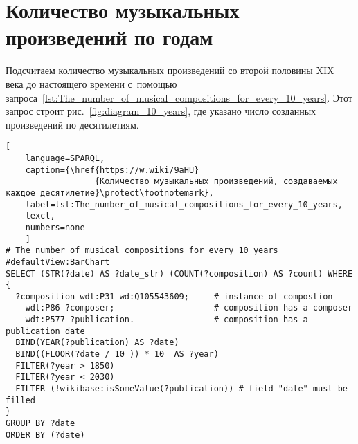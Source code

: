 





\section{Количество музыкальных произведений по годам}

Подсчитаем количество музыкальных произведений 
со второй половины XIX века до настоящего времени 
с~помощью запроса~\ref{lst:The_number_of_musical_compositions_for_every_10_years}. 
Этот запрос строит рис.~\ref{fig:diagram_10_years}, где 
указано число созданных произведений по десятилетиям. 


\begin{lstlisting}[ 
    language=SPARQL,
    caption={\href{https://w.wiki/9aHU}
                  {Количество музыкальных произведений, создаваемых каждое десятилетие}\protect\footnotemark},
    label=lst:The_number_of_musical_compositions_for_every_10_years,
    texcl,
    numbers=none
    ]
# The number of musical compositions for every 10 years
#defaultView:BarChart
SELECT (STR(?date) AS ?date_str) (COUNT(?composition) AS ?count) WHERE {
  ?composition wdt:P31 wd:Q105543609;     # instance of compostion
    wdt:P86 ?composer;                    # composition has a composer
    wdt:P577 ?publication.                # composition has a publication date
  BIND(YEAR(?publication) AS ?date)
  BIND((FLOOR(?date / 10 )) * 10  AS ?year)
  FILTER(?year > 1850)
  FILTER(?year < 2030) 
  FILTER (!wikibase:isSomeValue(?publication)) # field "date" must be filled
}
GROUP BY ?date
ORDER BY (?date)
\end{lstlisting}%


